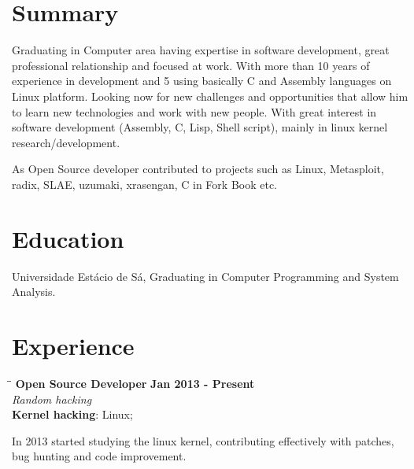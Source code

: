 \documentclass[margin]{res}
\begin{document}

\address{Juazeiro do Norte, CE, Brazil \\
  \href{mailto:geyslan@gmail.com}{geyslan@gmail.com} \\ Phone: 55 88 99617 0441
  \\ Postal Code: 63034-100 }


\begin{resume}

  \section{Summary} Graduating in Computer area having expertise in software
  development, great professional relationship and focused at work.
  With more than 10 years of experience in development and 5 using
  basically C and Assembly languages on Linux platform. Looking now
  for new challenges and opportunities that allow him to learn new
  technologies and work with new people. With great interest in
  software development (Assembly, C, Lisp, Shell script), mainly
  in linux kernel research/development.

  As Open Source developer contributed to projects such as Linux,
  Metasploit, radix, SLAE, uzumaki, xrasengan, C in Fork Book etc.

  \section{Education} Universidade Estácio de Sá, Graduating in Computer
  Programming and System Analysis.

\section{Experience}

\vspace{-0.1in}
\begin{tabbing}
  \hspace{2.3in}\= \hspace{1.7in}\= \kill %
  \textbf{Open Source Developer}    \>\>\textbf{Jan 2013 - Present}\\
  \textit{Random hacking}\\
  \textbf{Kernel hacking}: Linux;
\end{tabbing}\vspace{-20pt}      %
\vspace{2mm} In 2013 started studying the linux kernel, contributing
effectively with patches, bug hunting and code improvement.


\end{resume}
\end{document}
